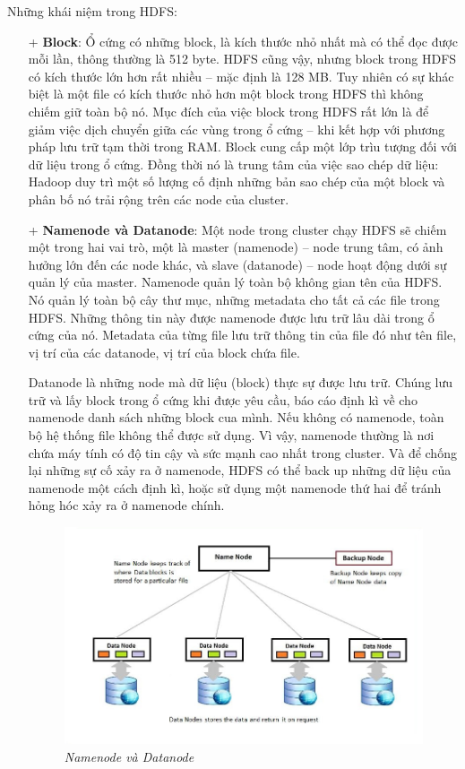 \documentclass[12pt]{report}
\begin{document}
Những khái niệm trong HDFS:
\begin{itemize}
\item[+] \textbf{Block}: Ổ cứng có những block, là kích thước nhỏ nhất mà có thể đọc được mỗi lần, thông thường là 512 byte. HDFS cũng vậy, nhưng block trong HDFS có kích thước lớn hơn rất nhiều – mặc định là 128 MB. Tuy nhiên có sự khác biệt là một file có kích thước nhỏ hơn một block trong HDFS thì không chiếm giữ toàn bộ nó. Mục đích của việc block trong HDFS rất lớn là để giảm việc dịch chuyển giữa các vùng trong ổ cứng – khi kết hợp với phương pháp lưu trữ tạm thời trong RAM. Block cung cấp một lớp trìu tượng đối với dữ liệu trong ổ cứng. Đồng thời nó là trung tâm của việc sao chép dữ liệu: Hadoop duy trì một số lượng cố định những bản sao chép của một block và phân bố nó trải rộng trên các node của cluster. 

\item[+] \textbf{Namenode và Datanode}: Một node trong cluster chạy HDFS sẽ chiếm một trong hai vai trò, một là master (namenode) – node trung tâm, có ảnh hưởng lớn đến các node khác, và slave (datanode) – node hoạt động dưới sự quản lý của master. Namenode quản lý toàn bộ không gian tên của HDFS. Nó quản lý toàn bộ cây thư mục, những metadata cho tất cả các file trong HDFS. Những thông tin này được namenode được lưu trữ lâu dài trong ổ cứng của nó. Metadata của từng file lưu trữ thông tin của file đó như tên file, vị trí của các datanode, vị trí của block chứa file.

Datanode là những node mà dữ liệu (block) thực sự được lưu trữ. Chúng lưu trữ và lấy block trong ổ cứng khi được yêu cầu, báo cáo định kì về cho namenode danh sách những block cua mình. Nếu không có namenode, toàn bộ hệ thống file không thể được sử dụng. Vì vậy, namenode thường là nơi chứa máy tính có độ tin cậy và sức mạnh cao nhất trong cluster. Và để  chống lại những sự cố xảy ra ở namenode, HDFS có thể back up những dữ liệu của namenode một cách định kì, hoặc sử dụng một namenode thứ hai để tránh hỏng hóc xảy ra ở namenode chính. 

\begin{figure}[H]
\centering
\includegraphics[width=\textwidth]{namenode.jpg}
\caption{\it Namenode và Datanode}
\end{figure}
\end{itemize}
\end{document}

